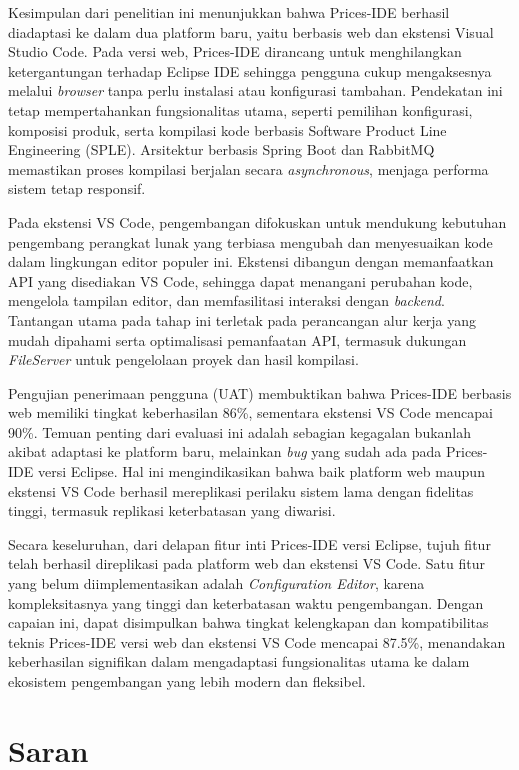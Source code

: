 \documentclass[12pt,a4paper,onecolumn]{article}
\begin{document}
Kesimpulan dari penelitian ini menunjukkan bahwa Prices-IDE berhasil diadaptasi ke dalam dua platform baru, yaitu berbasis web dan ekstensi Visual Studio Code. Pada versi web, Prices-IDE dirancang untuk menghilangkan ketergantungan terhadap Eclipse IDE sehingga pengguna cukup mengaksesnya melalui \textit{browser} tanpa perlu instalasi atau konfigurasi tambahan. Pendekatan ini tetap mempertahankan fungsionalitas utama, seperti pemilihan konfigurasi, komposisi produk, serta kompilasi kode berbasis Software Product Line Engineering (SPLE). Arsitektur berbasis Spring Boot dan RabbitMQ memastikan proses kompilasi berjalan secara \textit{asynchronous}, menjaga performa sistem tetap responsif.  

Pada ekstensi VS Code, pengembangan difokuskan untuk mendukung kebutuhan pengembang perangkat lunak yang terbiasa mengubah dan menyesuaikan kode dalam lingkungan editor populer ini. Ekstensi dibangun dengan memanfaatkan API yang disediakan VS Code, sehingga dapat menangani perubahan kode, mengelola tampilan editor, dan memfasilitasi interaksi dengan \textit{backend}. Tantangan utama pada tahap ini terletak pada perancangan alur kerja yang mudah dipahami serta optimalisasi pemanfaatan API, termasuk dukungan \textit{FileServer} untuk pengelolaan proyek dan hasil kompilasi.  

Pengujian penerimaan pengguna (UAT) membuktikan bahwa Prices-IDE berbasis web memiliki tingkat keberhasilan 86\%, sementara ekstensi VS Code mencapai 90\%. Temuan penting dari evaluasi ini adalah sebagian kegagalan bukanlah akibat adaptasi ke platform baru, melainkan \textit{bug} yang sudah ada pada Prices-IDE versi Eclipse. Hal ini mengindikasikan bahwa baik platform web maupun ekstensi VS Code berhasil mereplikasi perilaku sistem lama dengan fidelitas tinggi, termasuk replikasi keterbatasan yang diwarisi.  

Secara keseluruhan, dari delapan fitur inti Prices-IDE versi Eclipse, tujuh fitur telah berhasil direplikasi pada platform web dan ekstensi VS Code. Satu fitur yang belum diimplementasikan adalah \textit{Configuration Editor}, karena kompleksitasnya yang tinggi dan keterbatasan waktu pengembangan. Dengan capaian ini, dapat disimpulkan bahwa tingkat kelengkapan dan kompatibilitas teknis Prices-IDE versi web dan ekstensi VS Code mencapai 87.5\%, menandakan keberhasilan signifikan dalam mengadaptasi fungsionalitas utama ke dalam ekosistem pengembangan yang lebih modern dan fleksibel.  

\section*{Saran}
\end{document}
